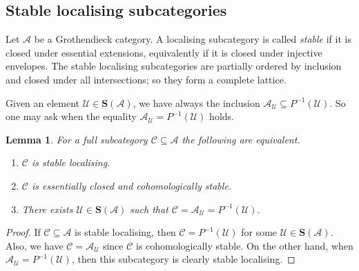 \documentclass[a4paper]{amsart}
\theoremstyle{plain}
\newtheorem{lem}[thm]{Lemma}
\theoremstyle{definition}
\theoremstyle{remark}
\numberwithin{equation}{section}
\def\A{\mathcal A}
\def\C{\mathcal C}
\def\U{\mathcal U}
\def\bfS{\mathbf S}
\begin{document}
\subsection*{Stable localising subcategories}

Let $\A$ be a Grothendieck category. A localising subcategory is called
\emph{stable} if it is closed under essential extensions, equivalently
if it is closed under injective envelopes. The stable localising
subcategories are partially ordered by inclusion and closed under all
intersections; so they form a complete lattice.

Given an element $\U\in\bfS(\A)$, we have always the inclusion
$\A_\U\subseteq P^{-1}(\U)$. So one may ask when the equality
$\A_\U=P^{-1}(\U)$ holds. 

\begin{lem}\label{le:coh}
  For  a full subcategory $\C\subseteq\A$ the following are
  equivalent.
  \begin{enumerate}
\item $\C$  is stable localising. 
\item $\C$ is essentially closed and cohomologically stable.
\item There exists $\U\in\bfS(\A)$ such that $\C=\A_\U=P^{-1}(\U)$.
  \end{enumerate}
\end{lem}
\begin{proof}
 If $\C\subseteq\A$ is stable localising, then $\C=P^{-1}(\U)$ for
 some $\U\in\bfS(\A)$. Also, we have $\C=\A_\U$ since $\C$ is
 cohomologically stable. On the other hand, when $\A_\U=P^{-1}(\U)$,
 then this subcategory is clearly stable localising.
\end{proof}
\end{document}
